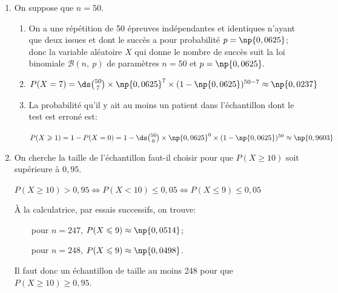 \begin{enumerate}
\item On suppose que $n = 50$.
	\begin{enumerate}
		\item 
On a une répétition de 50 épreuves indépendantes et identiques n'ayant que deux issues et dont le succès a pour probabilité $p=\np{0,0625}$; donc la variable aléatoire $X$ qui donne le nombre de succès suit la loi binomiale $\mathcal{B}(n,\: p)$ de paramètres $n = 50$ et $p = \np{0,0625}.$
		
		\item $P(X = 7) = \ds\binom{50}{7}\times \np{0,0625}^{7}\times (1-\np{0,0625})^{50-7}\approx \np{0,0237}$
		
		\item La probabilité qu'il y ait au moins un patient dans l'échantillon dont le test est erroné est:
		
$P(X\geqslant 1) = 1-P(X=0) = 1- \ds\binom{50}{0}\times \np{0,0625}^0\times (1-\np{0,0625})^{50}\approx \np{0,9603}$		
		
	\end{enumerate}	
\item On cherche la taille de l'échantillon faut-il choisir pour que $P(X \geqslant 10)$ soit supérieure à $0,95$.

$P(X \geqslant 10)>0,95 \iff P(X < 10) \leqslant 0,05 \iff P(X \leqslant 9) \leqslant 0,05$

À la calculatrice, par essais successifs, on trouve:

~~\textbullet~~pour $n=247$, $P(X\leqslant 9) \approx \np{0,0514}$;

~~\textbullet~~pour $n=248$, $P(X\leqslant 9) \approx \np{0,0498}$.

Il faut donc un échantillon de taille au moins 248 pour que $P(X\geqslant 10)\geqslant 0,95$.

\end{enumerate}

\bigskip
